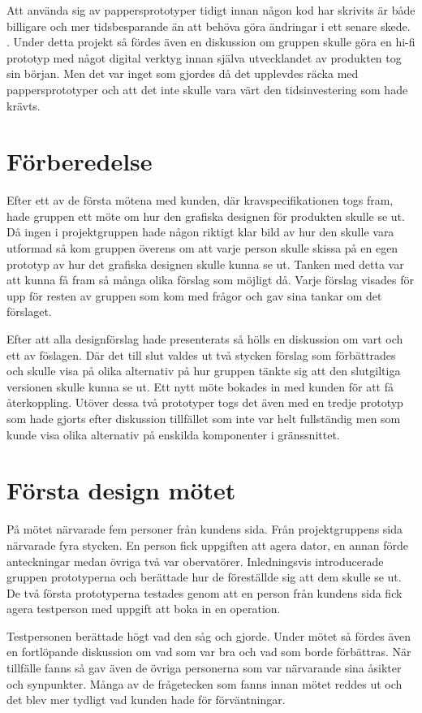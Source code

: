 Att använda sig av pappersprototyper tidigt innan någon kod har skrivits är både billigare och mer tidsbesparande än att behöva göra ändringar i ett senare skede. \cite{paper}. Under detta projekt så fördes även en diskussion om gruppen skulle göra en hi-fi prototyp med något digital verktyg innan själva utvecklandet av produkten tog sin början. Men det var inget som gjordes då det upplevdes räcka med pappersprototyper och att det inte skulle vara värt den tidsinvestering som hade krävts.      

\section{Förberedelse}
Efter ett av de första mötena med kunden, där kravspecifikationen togs fram, hade gruppen ett möte om hur den grafiska designen för produkten  skulle se ut. Då ingen i projektgruppen hade någon riktigt klar bild av hur den skulle vara utformad så kom gruppen överens om att varje person skulle skissa på en egen prototyp av hur det grafiska designen skulle kunna se ut. Tanken med detta var att kunna få fram så många olika förslag som möjligt då. Varje förslag visades för upp för resten av gruppen som kom med frågor och gav sina tankar om det förslaget.

Efter att alla designförslag hade presenterats så hölls en diskussion om vart och ett av föslagen. Där det till slut valdes ut två stycken förslag som förbättrades och skulle visa på olika alternativ på hur gruppen tänkte sig att den slutgiltiga versionen skulle kunna se ut. Ett nytt möte bokades in med kunden för att få återkoppling. Utöver dessa två prototyper togs det även med en tredje prototyp som hade gjorts efter diskussion tillfället som inte var helt fullständig men som kunde visa olika alternativ på enskilda komponenter i gränssnittet.

\section{Första design mötet}
På mötet närvarade fem personer från kundens sida. Från projektgruppens sida närvarade fyra stycken. En person fick uppgiften att agera dator, en annan förde anteckningar medan övriga två var obervatörer. Inledningsvis introducerade gruppen prototyperna och berättade hur de föreställde sig att dem skulle se ut. De två första prototyperna testades genom att en person från kundens sida fick agera testperson med uppgift att boka in en operation.

Testpersonen berättade högt vad den såg och gjorde. Under mötet så fördes även en fortlöpande diskussion om vad som var bra och vad som borde förbättras. När tillfälle fanns så gav även de övriga personerna som var närvarande sina åsikter och synpunkter. Många av de frågetecken som fanns innan mötet reddes ut och det blev mer tydligt vad kunden hade för förväntningar. 

